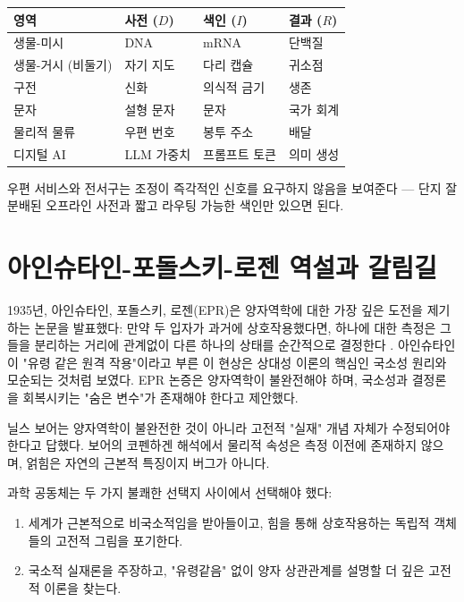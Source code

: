 \documentclass[12pt,a4paper]{article}
\begin{document}
	\begin{center}
		\begin{tabular}{p{3cm}p{3.5cm}p{3.5cm}p{3cm}}
			\toprule
			\textbf{영역} & \textbf{사전 ($D$)} & \textbf{색인 ($I$)} & \textbf{결과 ($R$)} \\
			\midrule
			생물-미시 & DNA & mRNA & 단백질 \\
			생물-거시 (비둘기) & 자기 지도 & 다리 캡슐 & 귀소점 \\
			구전 & 신화 & 의식적 금기 & 생존 \\
			문자 & 설형 문자 & 문자 & 국가 회계 \\
			물리적 물류 & 우편 번호 & 봉투 주소 & 배달 \\
			디지털 AI & LLM 가중치 & 프롬프트 토큰 & 의미 생성 \\
			\bottomrule
		\end{tabular}
	\end{center}
	
	우편 서비스와 전서구는 조정이 즉각적인 신호를 요구하지 않음을 보여준다 — 단지 잘 분배된 오프라인 사전과 짧고 라우팅 가능한 색인만 있으면 된다.
	
	\section{아인슈타인-포돌스키-로젠 역설과 갈림길}
	
	1935년, 아인슈타인, 포돌스키, 로젠(EPR)은 양자역학에 대한 가장 깊은 도전을 제기하는 논문을 발표했다: 만약 두 입자가 과거에 상호작용했다면, 하나에 대한 측정은 그들을 분리하는 거리에 관계없이 다른 하나의 상태를 순간적으로 결정한다 \cite{EPR1935}. 아인슈타인이 "유령 같은 원격 작용"이라고 부른 이 현상은 상대성 이론의 핵심인 국소성 원리와 모순되는 것처럼 보였다. EPR 논증은 양자역학이 불완전해야 하며, 국소성과 결정론을 회복시키는 "숨은 변수"가 존재해야 한다고 제안했다.
	
	닐스 보어는 양자역학이 불완전한 것이 아니라 고전적 "실재" 개념 자체가 수정되어야 한다고 답했다. 보어의 코펜하겐 해석에서 물리적 속성은 측정 이전에 존재하지 않으며, 얽힘은 자연의 근본적 특징이지 버그가 아니다.
	
	과학 공동체는 두 가지 불쾌한 선택지 사이에서 선택해야 했다:
	\begin{enumerate}
		\item 세계가 근본적으로 비국소적임을 받아들이고, 힘을 통해 상호작용하는 독립적 객체들의 고전적 그림을 포기한다.
		\item 국소적 실재론을 주장하고, "유령같음" 없이 양자 상관관계를 설명할 더 깊은 고전적 이론을 찾는다.
	\end{enumerate}
	
\end{document}
